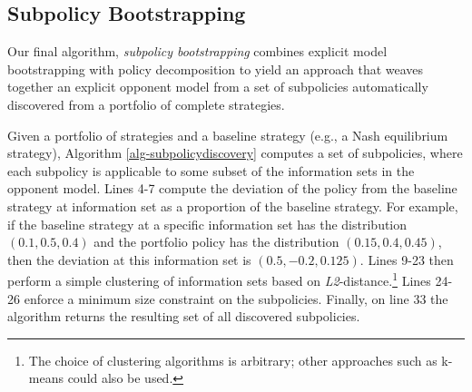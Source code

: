 \documentclass{aamas2013}
\begin{document}
    \subsection{Subpolicy Bootstrapping}
    Our final algorithm, \textit{subpolicy bootstrapping} combines explicit model bootstrapping with policy decomposition to yield an approach that weaves together an explicit opponent model from a set of subpolicies automatically discovered from a portfolio of complete strategies.

    Given a portfolio of strategies and a baseline strategy (e.g., a Nash equilibrium strategy), Algorithm \ref{alg-subpolicydiscovery} computes a set of subpolicies, where each subpolicy is applicable to some subset of the information sets in the opponent model. Lines 4-7 compute the deviation of the policy from the baseline strategy at information set as a proportion of the baseline strategy. For example, if the baseline strategy at a specific information set has the distribution $(0.1,0.5,0.4)$ and the portfolio policy has the distribution $(0.15, 0.4, 0.45)$, then the deviation at this information set is $(0.5, -0.2, 0.125)$. Lines 9-23 then perform a simple clustering of information sets based on \textit{L2}-distance.\footnote{The choice of clustering algorithms is arbitrary; other approaches such as k-means could also be used.} Lines 24-26 enforce a minimum size constraint on the subpolicies. Finally, on line 33 the algorithm returns the resulting set of all discovered subpolicies.
\end{document}
